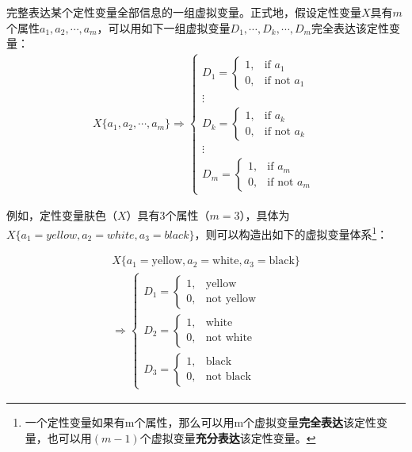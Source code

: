 \documentclass[12pt,(landscape,a4paper),(portrait,a4paper)]{article}
\let\rmarkdownfootnote\footnote%
\def\footnote{\protect\rmarkdownfootnote}
\theoremstyle{definition}
\theoremstyle{definition}
\theoremstyle{definition}
\theoremstyle{remark}
\let\BeginKnitrBlock\begin \let\EndKnitrBlock\end
\begin{document}
\BeginKnitrBlock{definition}[虚拟变量体系]
\protect\hypertarget{def:model-dummy}{}{\label{def:model-dummy}
{}
}完整表达某个定性变量全部信息的一组虚拟变量。正式地，假设定性变量\(X\)具有\(m\)个属性\(a_1,a_2,\cdots,a_m\)，可以用如下一组虚拟变量\(D_1,\cdots,D_k,\cdots,D_m\)完全表达该定性变量：
\begin{align}
X\{a_1,a_2,\cdots,a_m\} \Rightarrow  
  \begin{cases}
    D_1  =
    \begin{cases}
    1, & \text{if } a_1\\
    0, & \text{if not }  a_1
    \end{cases} \\
     \vdots \\
    D_k = 
    \begin{cases}
    1, & \text{if } a_k\\
    0, & \text{if not }  a_k
    \end{cases} \\
    \vdots\\
    D_m  =
    \begin{cases}
    1, & \text{if } a_m\\
    0, & \text{if not }  a_m
    \end{cases}
  \end{cases}
\end{align}
\EndKnitrBlock{definition}

例如，定性变量肤色（\(X\)）具有3个属性（\(m=3\)），具体为\(X\{a_1=yellow,a_2=white,a_3=black\}\)，则可以构造出如下的虚拟变量体系\footnote{一个定性变量如果有m个属性，那么可以用m个虚拟变量\textbf{完全表达}该定性变量，也可以用\((m-1)\)个虚拟变量\textbf{充分表达}该定性变量。}：

\begin{align}
X\{a_1=\text{yellow},a_2=\text{white},a_3=\text{black}\} \\
\Longrightarrow  
  \begin{cases}
    D_1  =
    \begin{cases}
    1, & \text{yellow}\\
    0, & \text{not yellow}
    \end{cases} \\
    D_2 = 
    \begin{cases}
    1, & \text{white}\\
    0, & \text{not white}
    \end{cases} \\
    D_3  =
    \begin{cases}
    1, & \text{black}\\
    0, & \text{not black}
    \end{cases}
  \end{cases}
\end{align}
\end{document}

